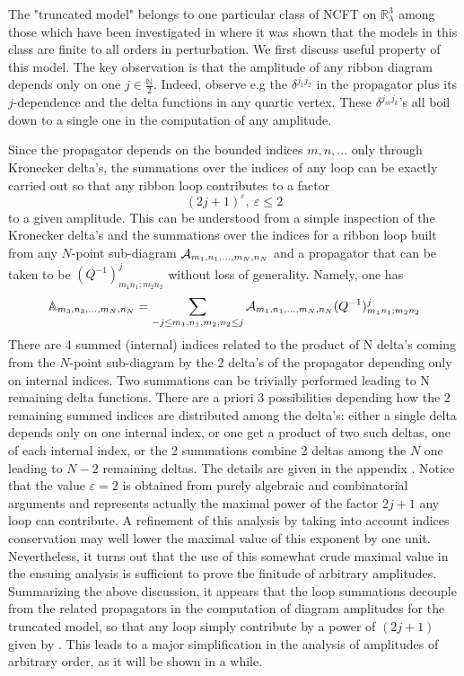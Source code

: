 \documentclass[10pt]{book}
\theoremstyle{break}
\begin{document}
The "truncated model" belongs to one particular class of NCFT on $\mathbb{R}^3_\lambda$ among those which have been investigated in %
where it was shown that the models in this class are finite to all orders in perturbation. We first discuss useful property of this model.
The key observation is that the amplitude of any ribbon diagram depends only on one $j\in\frac{\mathbb{N}}{2}$. Indeed, observe e.g the $\delta^{j_1j_2}$ in the propagator %
plus its $j$-dependence and the delta functions in any quartic vertex. These $\delta^{j_mj_k}$'s all boil down to a single one in the computation of any amplitude.

Since the propagator %
depends on the bounded indices $m,n,...$ only through Kronecker delta's, the summations over the indices of any loop can be exactly carried out so that any ribbon loop contributes to a factor 
\begin{equation}
(2j+1)^\varepsilon,\ \varepsilon\le2 %
\end{equation}
to a given amplitude. This can be understood from a simple inspection of the Kronecker delta's and the summations over the indices for a ribbon loop built from any $N$-point sub-diagram ${\cal{A}}_{m_1,n_1,...,m_N,n_N}$ and a propagator %
that can be taken to be $(Q^{-1})^j_{m_1n_1;m_2n_2}$ without loss of generality. Namely, one has
\begin{equation}
\mathbb{A}_{m_3,n_3,...,m_N,n_N}=\sum_{-j\le m_1,n_1,m_2,n_2\le j}{\cal{A}}_{m_1,n_1,...,m_N,n_N}(Q^{-1})^j_{m_1n_1;m_2n_2}%
\end{equation}
There are 4 summed (internal) indices related to the product of N delta's 
coming from the $N$-point sub-diagram by the 2 delta's of the propagator depending only on internal indices. Two summations 
can be trivially performed leading to N remaining delta functions. There are a priori 3 possibilities depending how the 2 remaining summed indices are distributed among the delta's: either a single delta depends only on one internal index, or one get a product of two such deltas, one of each internal index, or
the 2 summations combine 2 deltas among the $N$ one leading to $N-2$ remaining deltas. The details are given in the appendix %
. Notice that the value $\varepsilon=2$ is obtained from purely algebraic and combinatorial arguments and represents actually the maximal power of the factor $2j+1$ any loop can contribute. A refinement of this analysis by taking into account indices conservation may well lower the maximal value of this exponent by one unit. Nevertheless, it turns out that the use of this somewhat crude maximal value in the ensuing analysis is sufficient to prove the finitude of arbitrary amplitudes. Summarizing the above discussion, it appears that the loop summations decouple from the related propagators in the computation of diagram amplitudes for the truncated model, so that any loop simply contribute by a power of $(2j+1)$ given by %
. This leads to a major simplification in the analysis of amplitudes of arbitrary order, as it will be shown in a while.\par
\end{document}
